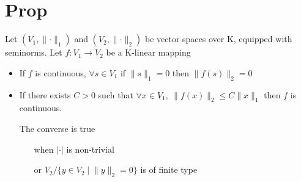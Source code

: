 \documentclass{book}
\begin{document}
\section{Prop}
Let $(V_1,\lVert\cdot\rVert _1)$ and $(V_2,\lVert\cdot\rVert _2)$ be vector spaces over K, equipped with seminorms. Let $f:V_1\rightarrow V_2$ be a K-linear mapping\begin{itemize}
    \item If $f$ is continuous, $\forall s\in V_1$ if $\lVert s\rVert _1=0$ then $\lVert f(s)\rVert _2=0$
    \item If there exists $C>0$ such that $\forall x\in V_1,\ \lVert f(x)\rVert _2\leq C\lVert x\rVert _1$ then $f$ is continuous.
    
    The converse is true \begin{itemize}
        \item [when]$\lvert\cdot\rvert$ is non-trivial
        \item [or] $V_2/\{y\in V_2\mid\lVert y\rVert _2=0\}$ is of finite type
    \end{itemize}
\end{itemize}
\end{document}
